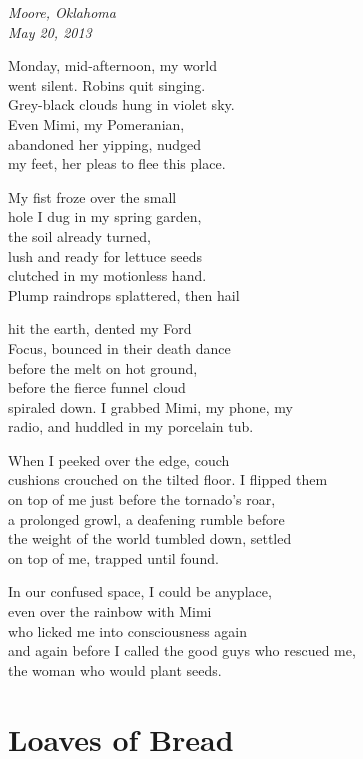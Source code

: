 \documentclass[twoside,10pt]{book}
\begin{document}
\emph{Moore, Oklahoma\\
May 20, 2013}

Monday, mid-afternoon, my world\\
went silent. Robins quit singing.\\
Grey-black clouds hung in violet sky.\\
Even Mimi, my Pomeranian,\\
abandoned her yipping, nudged\\
my feet, her pleas to flee this place.

My fist froze over the small\\
hole I dug in my spring garden,\\
the soil already turned,\\
lush and ready for lettuce seeds\\
clutched in my motionless hand.\\
Plump raindrops splattered, then hail

hit the earth, dented my Ford\\
Focus, bounced in their death dance\\
before the melt on hot ground,\\
before the fierce funnel cloud\\
spiraled down. I grabbed Mimi, my phone, my\\
radio, and huddled in my porcelain tub.

When I peeked over the edge, couch\\
cushions crouched on the tilted floor. I flipped them\\
on top of me just before the tornado's roar,\\
a prolonged growl, a deafening rumble before\\
the weight of the world tumbled down, settled\\
on top of me, trapped until found.

In our confused space, I could be anyplace,\\
even over the rainbow with Mimi\\
who licked me into consciousness again\\
and again before I called the good guys who rescued me,\\
the woman who would plant seeds.


\clearpage
\section{Loaves of Bread}
\end{document}
